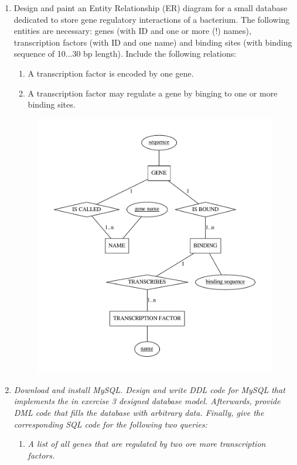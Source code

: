 \documentclass[a4paper,10pt,titlepage]{article}
\begin{document}
\begin{enumerate}
\item
Design and paint an Entity Relationship (ER) diagram for a small database dedicated to store gene regulatory interactions of a bacterium. The following entities are necessary: genes (with ID and one or more (!) names), transcription factors (with ID and one name) and binding sites (with binding sequence of 10...30 bp length). Include the following relations: 
\begin{enumerate}
\item 
A transcription factor is encoded by one gene. 
\item 
A transcription factor may regulate a gene by binging to one or more binding sites.
\end{enumerate}
\begin{figure}[H]
\centering
\includegraphics[scale=0.4]{graph.pdf}

\end{figure}
\item
\textit{Download and install MySQL. Design and write DDL code for MySQL that implements the in exercise 3 designed database model. Afterwards, provide DML code that fills the database with arbitrary data. Finally, give the corresponding 
SQL code for the following two queries:}
\begin{enumerate}
\item
\textit{A list of all genes that are regulated by two ore more transcription factors.}


\end{enumerate}
\end{enumerate}
\end{document}
